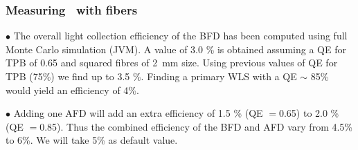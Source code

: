 \begin{frame}
\begin{columns}
\end{columns}
\end{frame}

\begin{frame}
\frametitle{Measuring \sone\ with fibers}


$\bullet$ The overall light collection efficiency of the BFD has been computed using full Monte Carlo simulation (JVM). A value of 3.0 \% is obtained assuming a QE  for TPB of 0.65 and squared fibres of \SI{2}{mm} size. Using previous values of QE for TPB (75\%) we find up to 3.5 \%. Finding a primary WLS with a QE $\sim$ 85\% would yield an efficiency of 4\%. 

$\bullet$ Adding one AFD will add an extra efficiency of 1.5 \% (QE $=$0.65) to
 2.0 \% (QE $=$0.85). Thus the combined efficiency of the BFD and AFD vary from
 4.5\% to 6\%. We will take 5\% as default value. 
\end{frame}

